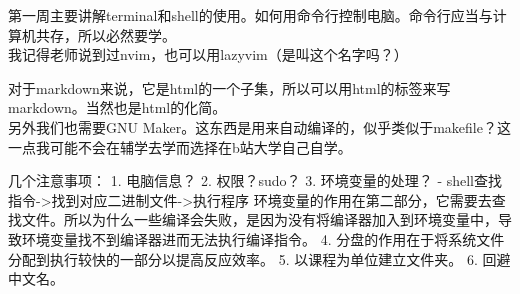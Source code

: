 \documentclass{article}
\begin{document}
第一周主要讲解terminal和shell的使用。如何用命令行控制电脑。命令行应当与计算机共存，所以必然要学。\\
我记得老师说到过nvim，也可以用lazyvim（是叫这个名字吗？）

对于markdown来说，它是html的一个子集，所以可以用html的标签来写markdown。当然也是html的化简。\\

另外我们也需要GNU Maker。这东西是用来自动编译的，似乎类似于makefile？这一点我可能不会在辅学去学而选择在b站大学自己自学。

几个注意事项：
1. 电脑信息？
2. 权限？sudo？
3. 环境变量的处理？
- shell查找指令->找到对应二进制文件->执行程序
环境变量的作用在第二部分，它需要去查找文件。所以为什么一些编译会失败，是因为没有将编译器加入到环境变量中，导致环境变量找不到编译器进而无法执行编译指令。
4. 分盘的作用在于将系统文件分配到执行较快的一部分以提高反应效率。
5. 以课程为单位建立文件夹。
6. 回避中文名。
\end{document}
